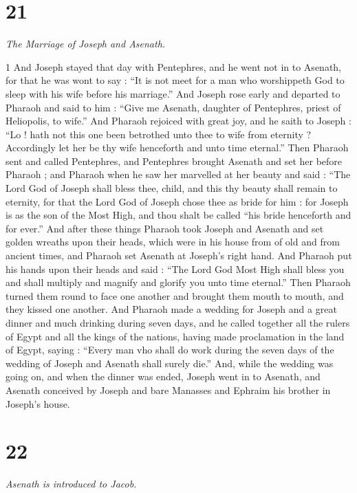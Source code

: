 \chapter{21}

\par \textit{The Marriage of Joseph and Asenath.}

1 And Joseph stayed that day with Pentephres, and he went not in to Asenath, for that he was wont to say : “It is not meet for a man who worshippeth God to sleep with his wife before his marriage.” And Joseph rose early and departed to Pharaoh and said to him : “Give me Asenath, daughter of Pentephres, priest of Heliopolis, to wife.” And Pharaoh rejoiced with great joy, and he saith to Joseph : “Lo ! hath not this one been betrothed unto thee to wife from eternity ? Accordingly let her be thy wife henceforth and unto time eternal.” Then Pharaoh sent and called Pentephres, and Pentephres brought Asenath and set her before Pharaoh ; and Pharaoh when he saw her marvelled at her beauty and said : “The Lord God of Joseph shall bless thee, child, and this thy beauty shall remain to eternity, for that the Lord God of Joseph chose thee as bride for him : for Joseph is as the son of the Most High, and thou shalt be called “his bride henceforth and for ever.” And after these things Pharaoh took Joseph and Asenath and set golden wreaths upon their heads, which were in his house from of old and from ancient times, and Pharaoh set Asenath at Joseph's right hand. And Pharaoh put his hands upon their heads and said : “The Lord God Most High shall bless you and shall multiply and magnify and glorify you unto time eternal.” Then Pharaoh turned them round to face one another and brought them mouth to mouth, and they kissed one another. And Pharaoh made a wedding for Joseph and a great dinner and much drinking during seven days, and he called together all the rulers of Egypt and all the kings of the nations, having made proclamation in the land of Egypt, saying :  “Every man vho shall do work during the seven days of the wedding of Joseph and Asenath shall surely die.” And, while the wedding was going on, and when the dinner was ended, Joseph went in to Asenath, and Asenath conceived by Joseph and bare Manasses and Ephraim his brother in Joseph's house.

\chapter{22}

\par \textit{Asenath is introduced to Jacob.}


